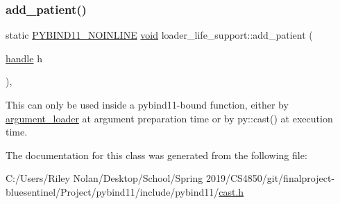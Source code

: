 \subsubsection{\texorpdfstring{add\_patient()}{add\_patient()}}
{\footnotesize\ttfamily static \mbox{\hyperlink{detail_2common_8h_a1fb186b7494d5c576d902c0730ecbb71}{P\+Y\+B\+I\+N\+D11\+\_\+\+N\+O\+I\+N\+L\+I\+NE}} \mbox{\hyperlink{_s_d_l__opengles2__gl2ext_8h_ae5d8fa23ad07c48bb609509eae494c95}{void}} loader\+\_\+life\+\_\+support\+::add\+\_\+patient (\begin{DoxyParamCaption}\item[{\mbox{\hyperlink{classhandle}{handle}}}]{h }\end{DoxyParamCaption})\hspace{0.3cm}{\ttfamily [inline]}, {\ttfamily [static]}}

This can only be used inside a pybind11-\/bound function, either by {\ttfamily \mbox{\hyperlink{classargument__loader}{argument\+\_\+loader}}} at argument preparation time or by {\ttfamily py\+::cast()} at execution time. 

The documentation for this class was generated from the following file\+:\begin{DoxyCompactItemize}
\item 
C\+:/\+Users/\+Riley Nolan/\+Desktop/\+School/\+Spring 2019/\+C\+S4850/git/finalproject-\/bluesentinel/\+Project/pybind11/include/pybind11/\mbox{\hyperlink{cast_8h}{cast.\+h}}\end{DoxyCompactItemize}

